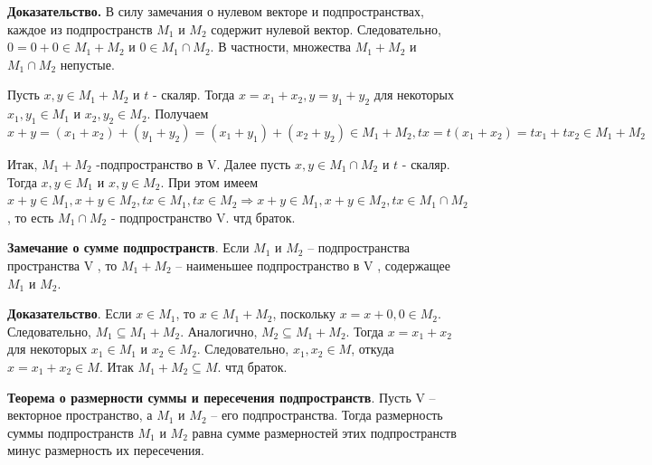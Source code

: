 \documentclass[a4paper]{article}
\begin{document}
\begin{hproof}
\textbf{Доказательство.} В силу замечания о нулевом векторе и подпространствах,
каждое из подпространств $M_1$ и $M_2$ содержит нулевой вектор. Следовательно, $0=0+0 \in M_1+M_2$ и $0 \in M_1 \cap M_2$. В частности, множества $M_1+M_2$ и $M_1 \cap M_2$ непустые.

Пусть $x, y \in M_1+M_2$ и $t$ - скаляр. Тогда $x=x_1+x_2, y=y_1+y_2$ для некоторых $x_1, y_1 \in M_1$ и $x_2, y_2 \in M_2$. Получаем \begin{equation}
x+y = (x_1+x_2) + (y_1+y_2) = (x_1+y_1)+(x_2+y_2) \in M_1 + M_2, tx = t(x_1 + x_2) = tx_1 + tx_2 \in M_1 + M_2
\end{equation}

Итак, $M_1+M_2$ -подпространство в V. Далее пусть $x, y \in M_1 \cap M_2$ и $t$ - скаляр. Тогда $x, y \in M_1$ и $x, y \in M_2$. При этом имеем $x+y \in M_1, x+y \in M_2, tx \in M_1, tx \in M_2 \Rightarrow x+y \in M_1, x+y \in M_2, tx \in M_1 \cap M_2$, то есть $M_1 \cap M_2$ - подпространство V. чтд браток.
\end{hproof}

\begin{htheorem}
\textbf{Замечание о сумме подпространств}. Если $M_1$ и $M_2$ – подпространства пространства V , то $M_1 + M_2$ –
наименьшее подпространство в V , содержащее $M_1$ и $M_2$.
\end{htheorem}


\begin{hproof}
\textbf{Доказательство}. Если $x \in M_1$, то $x \in M_1 + M_2$, поскольку $x = x + 0, 0 \in M_2$. Следовательно, $M_1 \subseteq M_1 + M_2$. Аналогично, $M_2 \subseteq M_1 + M_2$. Тогда $x = x_1 + x_2$ для некоторых $x_1 \in M_1$ и $x_2 \in M_2$. Следовательно, $x_1, x_2 \in M$, откуда $x=x_1+x_2 \in M$. Итак $M_1 + M_2 \subseteq M$. чтд браток.
\end{hproof}


\newpage \begin{center}\begin{Large}

\end{Large}\end{center}
\begin{htheorem}
\textbf{Теорема о размерности суммы и пересечения подпространств}. Пусть V – векторное пространство, а $M_1$ и $M_2$ – его подпространства.
Тогда размерность суммы подпространств $M_1$ и $M_2$ равна сумме размерностей этих подпространств минус размерность их пересечения. 
\end{htheorem}
\end{document}

